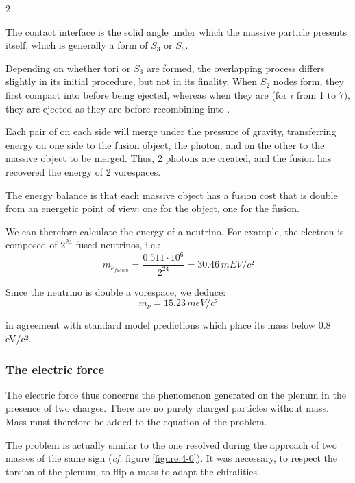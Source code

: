 	\begin{multicols}{2}
	
	The contact interface is the solid angle under which the massive particle presents itself, which is generally a form of $S_3$ or $S_6$.
	
	Depending on whether tori or $S_3$ are formed, the overlapping process differs slightly in its initial procedure, but not in its finality. When $S_2$ nodes form, they first compact into  before being ejected, whereas when they are  (for $i$ from 1 to 7), they are ejected as they are before recombining into .
	
	Each pair of  on each side will merge under the pressure of gravity, transferring energy on one side to the fusion object, the photon, and on the other to the massive object to be merged. Thus, 2 photons are created, and the fusion has recovered the energy of 2 vorespaces.
	
	The energy balance is that each massive object has a fusion cost that is double from an energetic point of view: one for the object, one for the fusion.
	
	We can therefore calculate the energy of a neutrino. For example, the electron is composed of $2^{24}$ fused neutrinos, i.e.:
	\begin{equation*}
		m_{\nu_{fusion}} = \frac {0.511 \cdot 10^6} {2^{24}} = 30.46\,mEV/c²
	\end{equation*}
	
	Since the neutrino is double a vorespace, we deduce:
	\begin{equation*}
		m_{\nu} = 15.23\,meV/c²
	\end{equation*}
	
	in agreement with standard model predictions which place its mass below 0.8\,eV/c².
	
	\subsubsection{The electric force}
	
	The electric force thus concerns the phenomenon generated on the plenum in the presence of two charges. There are no purely charged particles without mass. Mass must therefore be added to the equation of the problem.
	
	The problem is actually similar to the one resolved during the approach of two masses of the same sign (\textit{cf.} figure \ref{figure:4-0}). It was necessary, to respect the torsion of the plenum, to flip a mass to adapt the chiralities.
	

\end{multicols}
